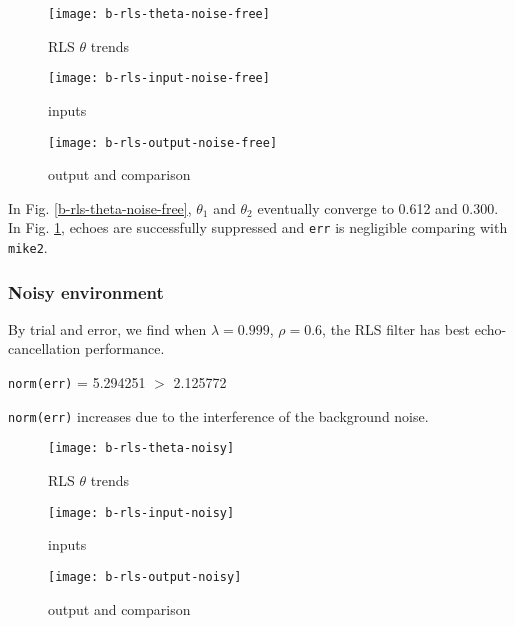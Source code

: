 \documentclass{article}
\begin{document}
\begin{figure}[H]
\begin{minipage}[t]{0.33\linewidth}
\centering
\texttt{[image: b-rls-theta-noise-free]}
\caption{RLS $\theta$ trends}
\label{b-rls-theta-noise-free}
\end{minipage}
\begin{minipage}[t]{0.33\linewidth}
\centering
\texttt{[image: b-rls-input-noise-free]}
\caption{inputs}
\end{minipage}
\begin{minipage}[t]{0.33\linewidth}
\centering
\texttt{[image: b-rls-output-noise-free]}
\caption{output and comparison}
\label{b-rls-output-noise-free}
\end{minipage}
\end{figure}

In Fig. \ref{b-rls-theta-noise-free}, $\theta_1$ and $\theta_2$ eventually converge to 0.612 and 0.300. In Fig. \ref{b-rls-output-noise-free}, echoes are successfully suppressed and \texttt{err} is negligible comparing with \texttt{mike2}.


\subsubsection*{Noisy environment}

By trial and error, we find when $\lambda = 0.999$, $\rho = 0.6$, the RLS filter has best echo-cancellation performance.
\begin{center}
\texttt{norm(err)} = 5.294251 $>$ 2.125772
\end{center}
\texttt{norm(err)} increases due to the interference of the background noise.

\begin{figure}[H]
\begin{minipage}[t]{0.33\linewidth}
\centering
\texttt{[image: b-rls-theta-noisy]}
\caption{RLS $\theta$ trends}
\label{b-rls-theta-noisy}
\end{minipage}
\begin{minipage}[t]{0.33\linewidth}
\centering
\texttt{[image: b-rls-input-noisy]}
\caption{inputs}
\end{minipage}
\begin{minipage}[t]{0.33\linewidth}
\centering
\texttt{[image: b-rls-output-noisy]}
\caption{output and comparison}
\label{b-rls-output-noisy}
\end{minipage}
\end{figure}
\end{document}
